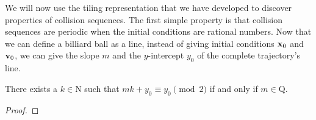 We will now use the tiling representation that we have developed to discover properties of collision sequences. The first simple property is that collision sequences are periodic when the initial conditions are rational numbers. Now that we can define a billiard ball as a line, instead of giving initial conditions $\mathbf{x}_0$ and $\mathbf{v}_0$, we can give the slope $m$ and the $y$-intercept $y_0$ of the complete trajectory's line.

\begin{theorem}
  There exists a $k \in \mathrm{N}$ such that $mk + y_0 \equiv y_0 \pmod{2}$ if and only if $m \in \mathrm{Q}$.
\end{theorem}
\begin{proof}
\end{proof}
